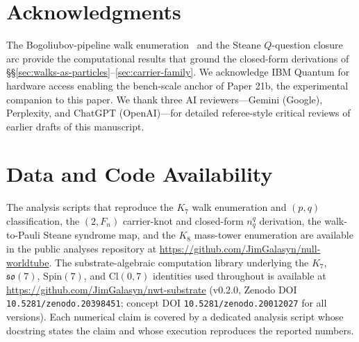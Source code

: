 \documentclass[11pt]{article}
\newcommand{\so}{\mathfrak{so}}
\begin{document}
\section*{Acknowledgments}

The Bogoliubov-pipeline walk enumeration~\cite{BogoliubovPipeline} and the Steane $Q$-question closure arc provide the computational results that ground the closed-form derivations of \S\S\ref{sec:walks-as-particles}--\ref{sec:carrier-family}.  We acknowledge IBM Quantum for hardware access enabling the bench-scale anchor of Paper 21b, the experimental companion to this paper.  We thank three AI reviewers---Gemini (Google), Perplexity, and ChatGPT (OpenAI)---for detailed referee-style critical reviews of earlier drafts of this manuscript.

\section*{Data and Code Availability}

The analysis scripts that reproduce the $K_7$ walk enumeration and $(p, q)$ classification, the $(2, F_n)$ carrier-knot and closed-form $n_q^q$ derivation, the walk-to-Pauli Steane syndrome map, and the $K_8$ mass-tower enumeration are available in the public analyses repository at \url{https://github.com/JimGalasyn/null-worldtube}.  The substrate-algebraic computation library underlying the $K_7$, $\so(7)$, $\mathrm{Spin}(7)$, and $\mathrm{Cl}(0, 7)$ identities used throughout is available at \url{https://github.com/JimGalasyn/nwt-substrate} (v0.2.0, Zenodo DOI \texttt{10.5281/zenodo.20398451}; concept DOI \texttt{10.5281/zenodo.20012027} for all versions).  Each numerical claim is covered by a dedicated analysis script whose docstring states the claim and whose execution reproduces the reported numbers.
\end{document}
